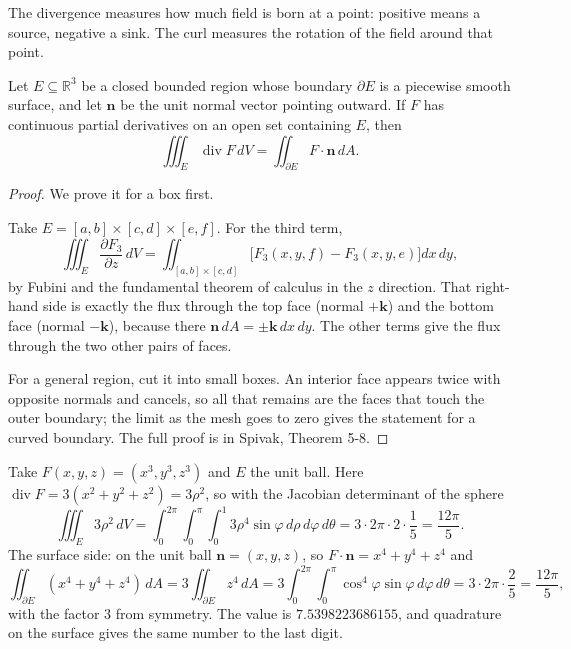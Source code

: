 The divergence measures how much field is born at a point: positive means a
source, negative a sink. The curl measures the rotation of the field around that point.

\begin{teorema}
Let $E\subseteq\mathbb{R}^{3}$ be a closed bounded region whose boundary
$\partial E$ is a piecewise smooth surface, and let $\mathbf{n}$ be the unit
normal vector pointing outward. If $F$ has continuous partial derivatives
on an open set containing $E$, then
\[
\iiint_{E}\operatorname{div}F\,dV=\iint_{\partial E}F\cdot\mathbf{n}\,dA .
\]
\end{teorema}

\begin{proof}
We prove it for a box first.

Take $E=[a,b]\times[c,d]\times[e,f]$. For the third term,
\[
\iiint_{E}\frac{\partial F_{3}}{\partial z}\,dV
=\iint_{[a,b]\times[c,d]}\bigl[F_{3}(x,y,f)-F_{3}(x,y,e)\bigr]dx\,dy ,
\]
by Fubini and the fundamental theorem of calculus in the $z$ direction. That right-hand side is exactly
the flux through the top face (normal $+\mathbf{k}$) and the bottom face (normal
$-\mathbf{k}$), because there $\mathbf{n}\,dA=\pm\mathbf{k}\,dx\,dy$. The other
terms give the flux through the two other pairs of faces.

For a general region, cut it into small boxes. An interior face appears twice
with opposite normals and cancels, so all that remains are the faces
that touch the outer boundary; the limit as the mesh goes to zero gives the statement for a curved
boundary. The full proof is in Spivak, Theorem 5-8.
\end{proof}

\begin{contoh}
Take $F(x,y,z)=(x^{3},y^{3},z^{3})$ and $E$ the unit ball. Here
$\operatorname{div}F=3(x^{2}+y^{2}+z^{2})=3\rho^{2}$, so with the
Jacobian determinant of the sphere
\[
\iiint_{E}3\rho^{2}\,dV=\int_{0}^{2\pi}\!\!\int_{0}^{\pi}\!\!\int_{0}^{1}
3\rho^{4}\sin\varphi\,d\rho\,d\varphi\,d\theta
=3\cdot2\pi\cdot2\cdot\frac15=\frac{12\pi}{5}.
\]
The surface side: on the unit ball $\mathbf{n}=(x,y,z)$, so
$F\cdot\mathbf{n}=x^{4}+y^{4}+z^{4}$ and
\[
\iint_{\partial E}(x^{4}+y^{4}+z^{4})\,dA=3\iint_{\partial E}z^{4}\,dA
=3\int_{0}^{2\pi}\!\!\int_{0}^{\pi}\cos^{4}\varphi\sin\varphi\,d\varphi\,d\theta
=3\cdot2\pi\cdot\frac25=\frac{12\pi}{5},
\]
with the factor $3$ from symmetry. The value is $7.5398223686155$, and quadrature on
the surface gives the same number to the last digit.
\end{contoh}


